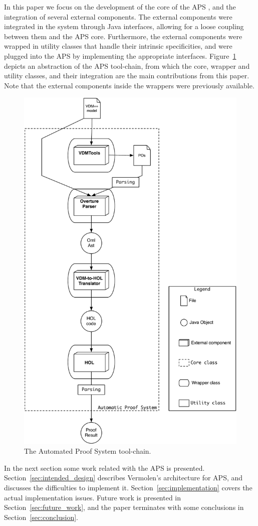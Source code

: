 \documentclass[]{article}
\begin{document}
In this paper we focus on the development of the core of the APS , and the integration of several external components.
The external components were integrated in the system through Java interfaces, allowing for a loose coupling between them and the APS core.
Furthermore, the external components were wrapped in utility classes that handle their intrinsic specificities, and were plugged into the APS by implementing the appropriate interfaces.
Figure~\ref{fig:aps_contrib} depicts an abstraction of the APS tool-chain, from which the core, wrapper and utility classes, and their integration are the main contributions from this paper.
Note that the external components inside the wrappers were previously available.

\begin{figure}
  \begin{center}
    \includegraphics[width=.6\textwidth]{images/tool_chain.pdf}
    \caption[APS tool-chain]{The Automated Proof System tool-chain.}
    \label{fig:aps_contrib}
  \end{center}
\end{figure}


In the next section some work related with the APS is presented.
Section~\ref{sec:intended_design} describes Vermolen's architecture for APS, and discusses the difficulties to implement it.
Section~\ref{sec:implementation} covers the actual implementation issues.
Future work is presented in Section~\ref{sec:future_work}, and the paper terminates with some conclusions in Section~\ref{sec:conclusion}.
\end{document}

